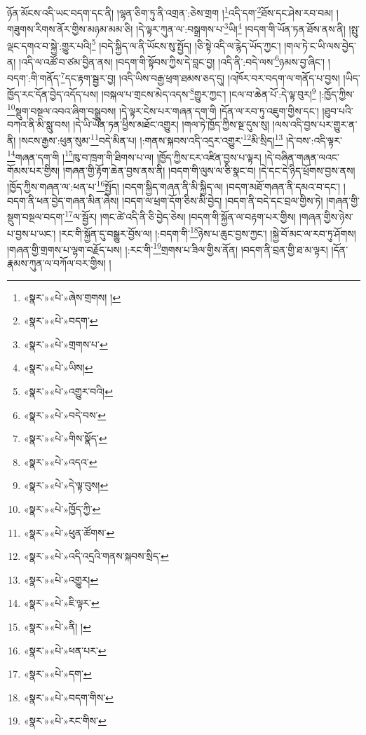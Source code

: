 ཉོན་མོངས་འདི་ཡང་བདག་དང་ནི། །ལྷན་ཅིག་ཏུ་ནི་འགྲན་:ཅེས་གྲག །\footnote{«སྣར་»«པེ་»ཞེས་གྲགས། །}འདི་དག་\footnote{«སྣར་»«པེ་»བདག་}ཐོས་དང་ཤེས་རབ་བམ། །གཟུགས་རིགས་ནོར་གྱིས་མཉམ་མམ་ཅི། །དེ་ལྟར་ཀུན་ལ་:བསྒྲགས་པ་\footnote{«སྣར་»«པེ་»གྲགས་པ་}ཡི།\footnote{«སྣར་»«པེ་»ཡིས།} །བདག་གི་ཡོན་ཏན་ཐོས་ནས་ནི། །སྤུ་ལྡང་དགའ་བ་སྐྱེ་:གྱུར་པའི།\footnote{«སྣར་»«པེ་»འགྱུར་བའི།} །བདེ་སྐྱིད་ལ་ནི་ཡོངས་སུ་སྤྱོད། །ཅི་སྟེ་འདི་ལ་རྙེད་ཡོད་ཀྱང་། །གལ་ཏེ་ང་ཡི་ལས་བྱེད་ན། །འདི་ལ་འཚོ་བ་ཙམ་བྱིན་ནས། །བདག་གི་སྟོབས་ཀྱིས་དེ་བླང་བྱ། །འདི་ནི་:བདེ་ལས་\footnote{«སྣར་»«པེ་»བདེ་བས་}ཉམས་བྱ་ཞིང་། །བདག་:གི་གནོད་\footnote{«སྣར་»«པེ་»གིས་སྣོད་}དང་རྟག་སྦྱར་བྱ། །འདི་ཡིས་བརྒྱ་ཕྲག་ཐམས་ཅད་དུ། །འཁོར་བར་བདག་ལ་གནོད་པ་བྱས། །ཡིད་ཁྱོད་རང་དོན་བྱེད་འདོད་པས། །བསྐལ་པ་གྲངས་མེད་འདས་\footnote{«སྣར་»«པེ་»འདའ་}གྱུར་ཀྱང་། །ངལ་བ་ཆེན་པོ་:དེ་ལྟ་བུར།\footnote{«སྣར་»«པེ་»དེ་ལྟ་བུས།} །:ཁྱོད་ཀྱིས་\footnote{«སྣར་»«པེ་»ཁྱོད་ཀྱི་}སྡུག་བསྔལ་འབའ་ཞིག་བསྒྲུབས། །དེ་ལྟར་ངེས་པར་གཞན་དག་གི །དོན་ལ་རབ་ཏུ་འཇུག་གྱིས་དང་། །ཐུབ་པའི་བཀའ་ནི་མི་སླུ་བས། །དེ་ཡི་ཡོན་ཏན་ཕྱིས་མཐོང་འགྱུར། །གལ་ཏེ་ཁྱོད་ཀྱིས་སྔ་དུས་སུ། །ལས་འདི་བྱས་པར་གྱུར་ན་ནི། །སངས་རྒྱས་:ཕུན་སུམ་\footnote{«སྣར་»«པེ་»ཕུན་ཚོགས་}བདེ་མིན་པ། །:གནས་སྐབས་འདི་འདྲར་འགྱུར་\footnote{«སྣར་»«པེ་»འདི་འདྲའི་གནས་སྐབས་སྲིད་}མི་སྲིད།\footnote{«སྣར་»«པེ་»འགྱུར།} །དེ་བས་:འདི་ལྟར་\footnote{«སྣར་»«པེ་»ཇི་ལྟར་}གཞན་དག་གི །\footnote{«སྣར་»«པེ་»ནི། །}ཁུ་བ་ཁྲག་གི་ཐིགས་པ་ལ། །ཁྱོད་ཀྱིས་ངར་འཛིན་བྱས་པ་ལྟར། །དེ་བཞིན་གཞན་ལའང་གོམས་པར་གྱིས། །གཞན་གྱི་རྟོག་ཆེན་བྱས་ནས་ནི། །བདག་གི་ལུས་ལ་ཅི་སྣང་བ། །དེ་དང་དེ་ཉིད་ཕྲོགས་བྱས་ནས། །ཁྱོད་ཀྱིས་གཞན་ལ་:ཕན་པ་\footnote{«སྣར་»«པེ་»ཕན་པར་}སྤྱོད། །བདག་སྐྱིད་གཞན་ནི་མི་སྐྱིད་ལ། །བདག་མཐོ་གཞན་ནི་དམའ་བ་དང་། །བདག་ནི་ཕན་བྱེད་གཞན་མིན་ཞེས། །བདག་ལ་ཕྲག་དོག་ཅིས་མི་བྱེད། །བདག་ནི་བདེ་དང་བྲལ་གྱིས་ཏེ། །གཞན་གྱི་སྡུག་བསྔལ་བདག་\footnote{«སྣར་»«པེ་»དག་}ལ་སྦྱོར། །གང་ཚེ་འདི་ནི་ཅི་བྱེད་ཅེས། །བདག་གི་སྐྱོན་ལ་བརྟག་པར་གྱིས། །གཞན་གྱིས་ཉེས་པ་བྱས་པ་ཡང་། །རང་གི་སྐྱོན་དུ་བསྒྱུར་བྱོས་ལ། །:བདག་གི་\footnote{«སྣར་»«པེ་»བདག་གིས་}ཉེས་པ་ཆུང་བྱས་ཀྱང་། །སྐྱེ་བོ་མང་ལ་རབ་ཏུ་ཤོགས། །གཞན་གྱི་གྲགས་པ་ལྷག་བརྗོད་པས། །:རང་གི་\footnote{«སྣར་»«པེ་»རང་གིས་}གྲགས་པ་ཟིལ་གྱིས་ནོན། །བདག་ནི་བྲན་གྱི་ཐ་མ་ལྟར། །དོན་རྣམས་ཀུན་ལ་བཀོལ་བར་གྱིས། །
